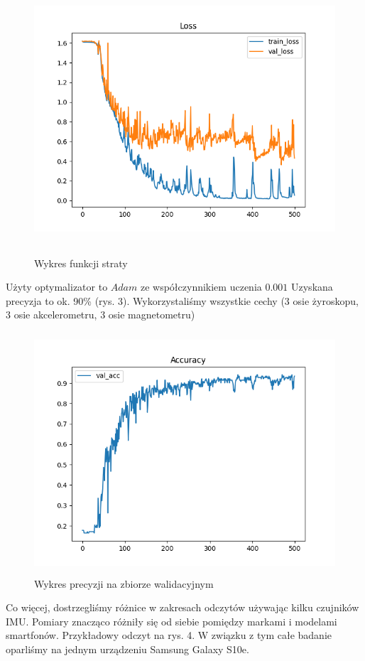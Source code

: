 \documentclass[10pt]{article}
\begin{document}
\begin{figure}[H]
  \includegraphics[height=10cm]{loss.png}
  \centering
  \caption{Wykres funkcji straty}
\end{figure}

Użyty optymalizator to $Adam$ ze współczynnikiem uczenia $0.001$
 Uzyskana precyzja to ok. 90\% (rys. 3). Wykorzystaliśmy wszystkie cechy (3 osie żyroskopu, 3 osie akcelerometru, 3 osie magnetometru)

 \begin{figure}[H]
  \includegraphics[height=9cm]{acc.png}
  \centering
  \caption{Wykres precyzji na zbiorze walidacyjnym}
\end{figure}

Co więcej, dostrzegliśmy różnice w zakresach odczytów używając kilku czujników IMU. Pomiary znacząco różniły się od siebie pomiędzy markami i modelami smartfonów. Przykładowy odczyt na rys. 4. W związku z tym całe badanie oparliśmy na jednym urządzeniu Samsung Galaxy S10e.
\end{document}
